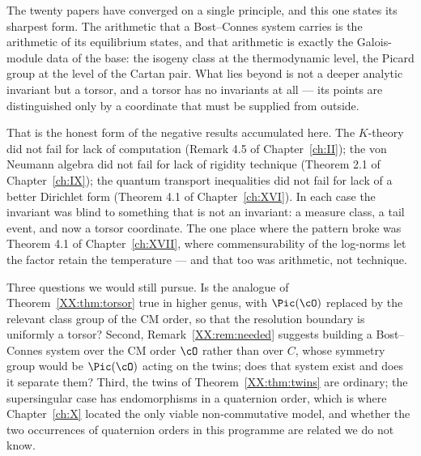 The twenty papers have converged on a single principle, and this one states its sharpest
form. The arithmetic that a Bost--Connes system carries is the arithmetic of its equilibrium
states, and that arithmetic is exactly the Galois-module data of the base: the isogeny class
at the thermodynamic level, the Picard group at the level of the Cartan pair. What lies
beyond is not a deeper analytic invariant but a torsor, and a torsor has no invariants at
all --- its points are distinguished only by a coordinate that must be supplied from outside.

That is the honest form of the negative results accumulated here. The $K$-theory did not fail
for lack of computation (Remark 4.5 of Chapter~\ref{ch:II}); the von Neumann algebra did not fail for
lack of rigidity technique (Theorem 2.1 of Chapter~\ref{ch:IX}); the quantum transport inequalities did not
fail for lack of a better Dirichlet form (Theorem 4.1 of Chapter~\ref{ch:XVI}). In each case the invariant
was blind to something that is not an invariant: a measure class, a tail event, and now a
torsor coordinate. The one place where the pattern broke was
Theorem 4.1 of Chapter~\ref{ch:XVII}, where commensurability of the log-norms let the factor retain the
temperature --- and that too was arithmetic, not technique.

Three questions we would still pursue. Is the analogue of Theorem~\ref{XX:thm:torsor} true in
higher genus, with $\Pic(\cO)$ replaced by the relevant class group of the CM order, so that
the resolution boundary is uniformly a torsor? Second, Remark~\ref{XX:rem:needed} suggests
building a Bost--Connes system over the CM order $\cO$ rather than over $C$, whose symmetry
group would be $\Pic(\cO)$ acting on the twins; does that system exist and does it separate
them? Third, the twins of Theorem~\ref{XX:thm:twins} are ordinary; the supersingular case has
endomorphisms in a quaternion order, which is where Chapter~\ref{ch:X} located the only viable
non-commutative model, and whether the two occurrences of quaternion orders in this programme
are related we do not know.

